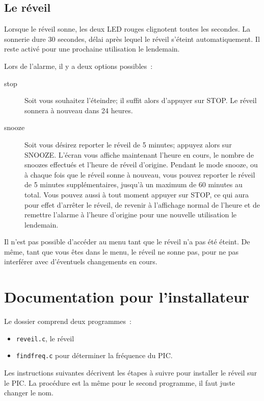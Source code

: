 \documentclass[12pt,a4paper]{article}
\begin{document}
\subsection{Le réveil}
Lorsque le réveil sonne, les deux LED rouges clignotent toutes les secondes. La sonnerie dure 30 secondes, délai après lequel le réveil s'éteint automatiquement. Il reste activé pour une prochaine utilisation le lendemain.

Lors de l'alarme, il y a deux options possibles~:
\begin{description}
\item[stop] Soit vous souhaitez l'éteindre; il suffit alors d'appuyer sur STOP. Le réveil sonnera à nouveau dans 24 heures.
\item[snooze] Soit vous désirez reporter le réveil de 5 minutes; appuyez alors sur SNOOZE. L'écran vous affiche maintenant l'heure en cours, le nombre de snoozes effectués et l'heure de réveil d'origine. Pendant le mode snooze, ou à chaque fois que le réveil sonne à nouveau, vous pouvez reporter le réveil de 5 minutes supplémentaires, jusqu'à un maximum de 60 minutes au total. Vous pouvez aussi à tout moment appuyer sur STOP, ce qui aura pour effet d'arrêter le réveil, de revenir à l'affichage normal de l'heure et de remettre l'alarme à l'heure d'origine pour une nouvelle utilisation le lendemain.
\end{description}

Il n'est pas possible d'accéder au menu tant que le réveil n'a pas été éteint. De même, tant que vous êtes dans le menu, le réveil ne sonne pas, pour ne pas interférer avec d'éventuels changements en cours.

\section{Documentation pour l'installateur}
Le dossier comprend deux programmes~:
\begin{itemize}
\item \texttt{reveil.c}, le réveil %
\item \texttt{findfreq.c} pour déterminer la fréquence du PIC.
\end{itemize}
Les instructions suivantes décrivent les étapes à suivre pour installer le réveil sur le PIC. La procédure est la même pour le second programme, il faut juste changer le nom.
\end{document}
